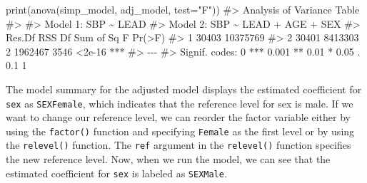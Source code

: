\documentclass[
  letterpaper,
]{krantz}
\makeatletter
\newenvironment{Shaded}{\begin{snugshade}}{\end{snugshade}}
\newcommand{\AttributeTok}[1]{\textcolor[rgb]{0.40,0.45,0.13}{#1}}
\newcommand{\CommentTok}[1]{\textcolor[rgb]{0.37,0.37,0.37}{#1}}
\newcommand{\FunctionTok}[1]{\textcolor[rgb]{0.28,0.35,0.67}{#1}}
\newcommand{\NormalTok}[1]{\textcolor[rgb]{0.00,0.23,0.31}{#1}}
\newcommand{\OtherTok}[1]{\textcolor[rgb]{0.00,0.23,0.31}{#1}}
\newcommand{\SpecialCharTok}[1]{\textcolor[rgb]{0.37,0.37,0.37}{#1}}
\newcommand{\StringTok}[1]{\textcolor[rgb]{0.13,0.47,0.30}{#1}}
\newenvironment{kframe}{%
\medskip{}
\setlength{\fboxsep}{.8em}
 \def\at@end@of@kframe{}%
 \ifinner\ifhmode%
  \def\at@end@of@kframe{\end{minipage}}%
  \begin{minipage}{\columnwidth}%
 \fi\fi%
 \def\FrameCommand##1{\hskip\@totalleftmargin \hskip-\fboxsep
 \colorbox{shadecolor}{##1}\hskip-\fboxsep
     \hskip-\linewidth \hskip-\@totalleftmargin \hskip\columnwidth}%
 \MakeFramed {\advance\hsize-\width
   \@totalleftmargin\z@ \linewidth\hsize
   \@setminipage}}%
 {\par\unskip\endMakeFramed%
 \at@end@of@kframe}
\renewenvironment{Shaded}{\begin{kframe}}{\end{kframe}}
\makeatother
\begin{document}
\begin{Shaded}
\begin{Highlighting}[]
\FunctionTok{print}\NormalTok{(}\FunctionTok{anova}\NormalTok{(simp\_model, adj\_model, }\AttributeTok{test=}\StringTok{"F"}\NormalTok{))}
\CommentTok{\#\textgreater{} Analysis of Variance Table}
\CommentTok{\#\textgreater{} }
\CommentTok{\#\textgreater{} Model 1: SBP \textasciitilde{} LEAD}
\CommentTok{\#\textgreater{} Model 2: SBP \textasciitilde{} LEAD + AGE + SEX}
\CommentTok{\#\textgreater{}   Res.Df      RSS Df Sum of Sq    F Pr(\textgreater{}F)    }
\CommentTok{\#\textgreater{} 1  30403 10375769                             }
\CommentTok{\#\textgreater{} 2  30401  8413303  2   1962467 3546 \textless{}2e{-}16 ***}
\CommentTok{\#\textgreater{} {-}{-}{-}}
\CommentTok{\#\textgreater{} Signif. codes:  0 \textquotesingle{}***\textquotesingle{} 0.001 \textquotesingle{}**\textquotesingle{} 0.01 \textquotesingle{}*\textquotesingle{} 0.05 \textquotesingle{}.\textquotesingle{} 0.1 \textquotesingle{} \textquotesingle{} 1}
\end{Highlighting}
\end{Shaded}

The model summary for the adjusted model displays the estimated
coefficient for \texttt{sex} as \texttt{SEXFemale}, which indicates that
the reference level for sex is male. If we want to change our reference
level, we can reorder the factor variable either by using the
\texttt{factor()} function and specifying \texttt{Female} as the first
level or by using the \texttt{relevel()} function. The \texttt{ref}
argument in the \texttt{relevel()} function specifies the new reference
level. Now, when we run the model, we can see that the estimated
coefficient for \texttt{sex} is labeled as \texttt{SEXMale}.

\begin{Shaded}
\end{Shaded}
\end{document}
